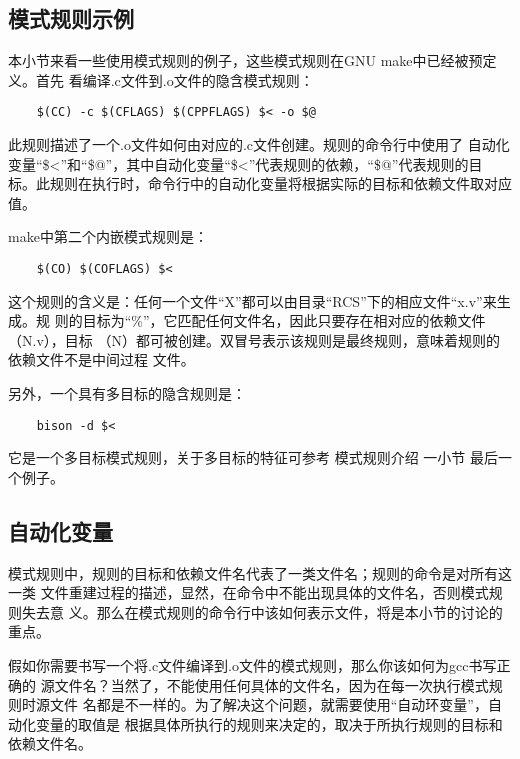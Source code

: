 \subsection{模式规则示例}
本小节来看一些使用模式规则的例子，这些模式规则在GNU make中已经被预定义。首先
看编译.c文件到.o文件的隐含模式规则：

\begin{Verbatim}[]
%.o : %.c
    $(CC) -c $(CFLAGS) $(CPPFLAGS) $< -o $@
\end{Verbatim}
\noindent 此规则描述了一个.o文件如何由对应的.c文件创建。规则的命令行中使用了
自动化变量“\$<”和“\$@”，其中自动化变量“\$<”代表规则的依赖，“\$@”代表规则的目
标。此规则在执行时，命令行中的自动化变量将根据实际的目标和依赖文件取对应值。

make中第二个内嵌模式规则是：
\begin{Verbatim}[]
% :: RCS/%,v
    $(CO) $(COFLAGS) $<
\end{Verbatim}
\noindent
这个规则的含义是：任何一个文件“X”都可以由目录“RCS”下的相应文件“x.v”来生成。规
则的目标为“\%”，它匹配任何文件名，因此只要存在相对应的依赖文件（N.v），目标
（N）都可被创建。双冒号表示该规则是最终规则，意味着规则的依赖文件不是中间过程
文件。

另外，一个具有多目标的隐含规则是：
\begin{Verbatim}[]
%.tab.c %.tab.h: %.y
    bison -d $<
\end{Verbatim}
\noindent 它是一个多目标模式规则，关于多目标的特征可参考 模式规则介绍 一小节
最后一个例子。

\subsection{自动化变量}
模式规则中，规则的目标和依赖文件名代表了一类文件名；规则的命令是对所有这一类
文件重建过程的描述，显然，在命令中不能出现具体的文件名，否则模式规则失去意
义。那么在模式规则的命令行中该如何表示文件，将是本小节的讨论的重点。

假如你需要书写一个将.c文件编译到.o文件的模式规则，那么你该如何为gcc书写正确的
源文件名？当然了，不能使用任何具体的文件名，因为在每一次执行模式规则时源文件
名都是不一样的。为了解决这个问题，就需要使用“自动环变量”，自动化变量的取值是
根据具体所执行的规则来决定的，取决于所执行规则的目标和依赖文件名。

